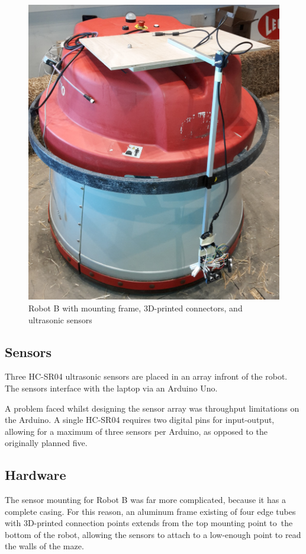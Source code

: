 \documentclass[11pt]{article}
\begin{document}
	\begin{figure}[h!]
		\centering
		\includegraphics[scale=0.1]{robot_b_full}
		\caption{Robot B with mounting frame, 3D-printed connectors, and ultrasonic sensors}
	\end{figure}
	
	\subsection{Sensors}
	Three HC-SR04 ultrasonic sensors are placed in an array infront of the robot. The sensors interface with the laptop via an Arduino Uno. \newline
	
	A problem faced whilst designing the sensor array was throughput limitations on the Arduino. A single HC-SR04 requires two digital pins for input-output, allowing for a maximum of three sensors per Arduino, as opposed to the originally planned five. \newline
	
	\subsection{Hardware}
	The sensor mounting for Robot B was far more complicated, because it has a complete casing. For this reason, an aluminum frame existing of four edge tubes with 3D-printed connection points extends from the top mounting point to the bottom of the robot, allowing the sensors to attach to a low-enough point to read the walls of the maze.\newline
	
\end{document}
